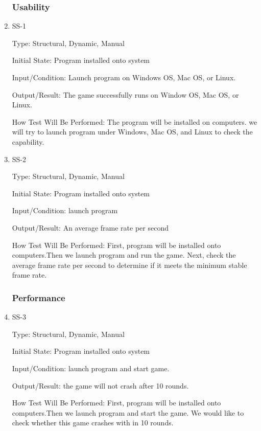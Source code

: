 \documentclass[12pt]{article}
\begin{document}
\begin{enumerate}
    \subsubsection{Usability}


    \item SS-1

    Type: Structural, Dynamic, Manual

    Initial State: Program installed onto system 

    Input/Condition: Launch program on Windows OS, Mac OS, or Linux.

    Output/Result: The game successfully runs on Window OS, Mac OS, or Linux.

    How Test Will Be Performed: The program will be installed on computers. we will try to launch program under Windows, Mac OS, and Linux to check the capability.


    \item SS-2

    Type: Structural, Dynamic, Manual

    Initial State: Program installed onto system

    Input/Condition: launch program

    Output/Result: An average frame rate per second

    How Test Will Be Performed: First, program will be installed onto computers.Then we launch program and run the game. Next, check the average frame rate per second to determine if it meets the minimum stable frame rate.


    \subsubsection{Performance}

    \item SS-3

    Type: Structural, Dynamic, Manual

    Initial State: Program installed onto system

    Input/Condition: launch program and start game.

    Output/Result: the game will not crash after 10 rounds.

    How Test Will Be Performed: First, program will be installed onto computers.Then we launch program and start the game. We would like to check whether this game crashes with in 10 rounds. 







\end{enumerate}
\end{document}
